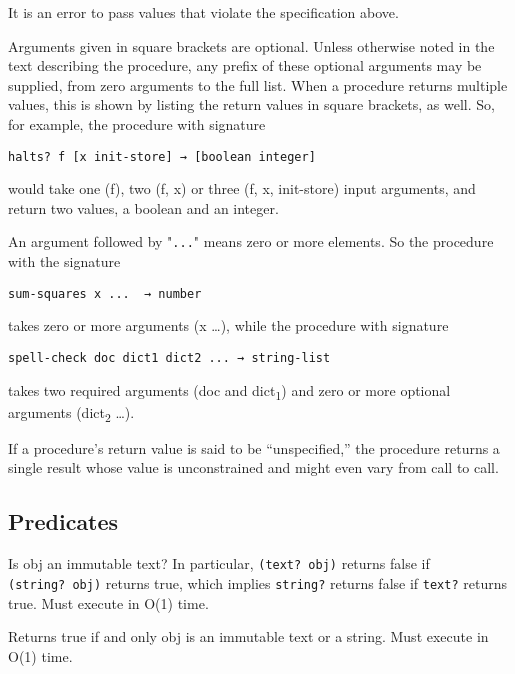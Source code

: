 It is an error to pass values that violate the specification above.

Arguments given in square brackets are optional. Unless otherwise noted
in the text describing the procedure, any prefix of these optional
arguments may be supplied, from zero arguments to the full list. When a
procedure returns multiple values, this is shown by listing the return
values in square brackets, as well. So, for example, the procedure with
signature

\begin{verbatim}
halts? f [x init-store] → [boolean integer]
\end{verbatim}

would take one (f), two (f, x) or three (f, x, init-store) input
arguments, and return two values, a boolean and an integer.

An argument followed by "\texttt{...}" means zero or more elements. So
the procedure with the signature

\begin{verbatim}
sum-squares x ...  → number
\end{verbatim}

takes zero or more arguments (x \ldots{}), while the procedure with
signature

\begin{verbatim}
spell-check doc dict1 dict2 ... → string-list
\end{verbatim}

takes two required arguments (doc and dict\textsubscript{1}) and zero or
more optional arguments (dict\textsubscript{2} \ldots{}).

If a procedure's return value is said to be ``unspecified,'' the
procedure returns a single result whose value is unconstrained and might
even vary from call to call.

\subsection{{Predicates}}\label{predicates}

\begin{entry}{%
  }

  Is obj an immutable
  text? In particular, \texttt{(text?\ obj)} returns false if
  \texttt{(string?\ obj)} returns true, which implies \texttt{string?}
  returns false if \texttt{text?} returns true. Must execute in O(1)
  time.
\end{entry}
\begin{entry}{%
  }

  Returns true if
  and only obj is an immutable text or a string. Must execute in O(1)
  time.
\end{entry}

